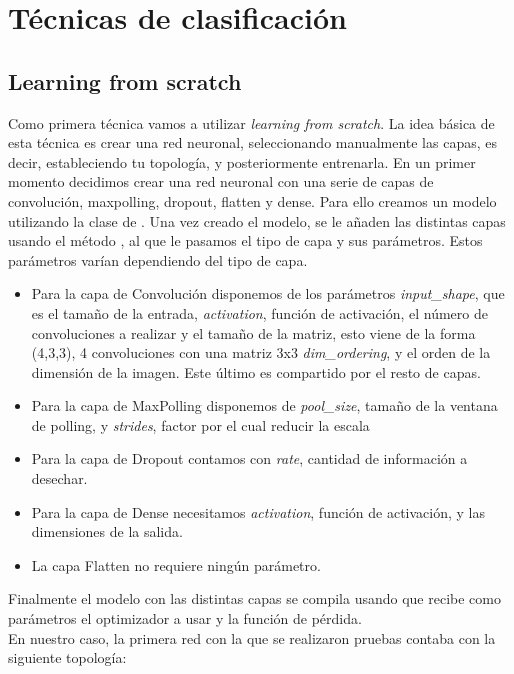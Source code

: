 \section{Técnicas de clasificación}

\subsection{Learning from scratch}

Como primera técnica vamos a utilizar \textit{learning from scratch}. La idea básica de esta técnica es crear una red neuronal, seleccionando manualmente las capas, es decir, estableciendo tu topología, y posteriormente entrenarla. En un primer momento decidimos crear una red neuronal con una serie de capas de convolución, maxpolling, dropout, flatten y dense. Para ello creamos un modelo utilizando la clase  de . Una vez creado el modelo, se le añaden las distintas capas usando el método , al que le pasamos el tipo de capa y sus parámetros. Estos parámetros varían dependiendo del tipo de capa.

\begin{itemize}
\item Para la capa de Convolución disponemos de los parámetros \textit{input\_shape}, que es el tamaño de la entrada, \textit{activation}, función de activación, el número de convoluciones a realizar y el tamaño de la matriz, esto viene de la forma (4,3,3), 4 convoluciones con una matriz 3x3 \textit{dim\_ordering}, y el orden de la dimensión de la imagen. Este último es compartido por el resto de capas. 
\item Para la capa de MaxPolling disponemos de \textit{pool\_size}, tamaño de la ventana de polling, y \textit{strides}, factor por el cual reducir la escala
\item Para la capa de Dropout contamos con \textit{rate}, cantidad de información a desechar.
\item Para la capa de Dense necesitamos \textit{activation}, función de activación, y las dimensiones de la salida.
\item La capa Flatten no requiere ningún parámetro.
\end{itemize}

Finalmente el modelo con las distintas capas se compila usando  que recibe como parámetros el optimizador a usar y la función de pérdida.\\

En nuestro caso, la primera red con la que se realizaron pruebas contaba con la siguiente topología:


